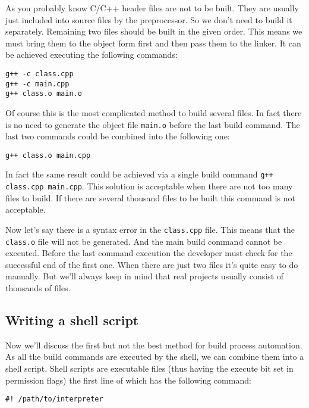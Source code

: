 As you probably know C/C++ header files are not to be built. They are usually just included into source files by the preprocessor. So we don't need to build it separately. Remaining two files should be built in the given order. This means we must bring them to the object form first and then pass them to the linker. It can be achieved executing the following commands:

\begin{lstlisting}[numbers=none]
g++ -c class.cpp 
g++ -c main.cpp  
g++ class.o main.o
\end{lstlisting}

Of course this is the most complicated method to build several files. In fact there is no need to generate the object file {\tt main.o} before the last build command. The last two commands could be combined into the following one:

\begin{lstlisting}[numbers=none]
g++ class.o main.cpp
\end{lstlisting}

{\remark In fact the same result could be achieved via a single build command {\tt g++ class.cpp main.cpp}. This solution is acceptable when there are not too many files to build. If there are several thousand files to be built this command is not acceptable.}

Now let's say there is a syntax error in the {\tt class.cpp} file. This means that the {\tt class.o} file will not be generated. And the main build command cannot be executed. Before the last command execution the developer must check for the successful end of the first one. When there are just two files it's quite easy to do manually. But we'll always keep in mind that real projects usually consist of thousands of files.

\subsection{Writing a shell script}
Now we'll discuss the first but not the best method for build process automation. As all the build commands are executed by the shell, we can combine them into a shell script. Shell scripts are executable files (thus having the execute bit set in permission flags) the first line of which has the following command:

\begin{lstlisting}[numbers=none]
#! /path/to/interpreter
\end{lstlisting}

